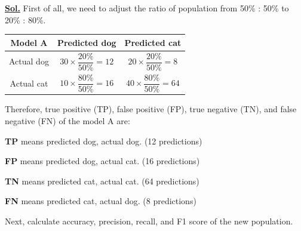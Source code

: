 \documentclass[12pt, a4paper]{article}
\newcommand{\sol}{\par\noindent\underline{\textbf{Sol.}} }
\begin{document}
\begin{enumerate}
            \sol First of all, we need to adjust the ratio of population from 50\% : 50\% to \\ 20\% : 80\%.

            \begin{table}[h]
                \centering
                \begin{tabular}{|c|c|c|}
                    \hline
                    Model A & Predicted dog & Predicted cat \\
                    \hline \hline
                    \rule{0pt}{4ex}
                    Actual dog & $30 \times \dfrac{20\%}{50\%} = 12$ & $20 \times \dfrac{20\%}{50\%} = 8$ \\[2ex]
                    \hline
                    \rule{0pt}{4ex}
                    Actual cat & $10 \times \dfrac{80\%}{50\%} = 16$ & $40 \times \dfrac{80\%}{50\%} = 64$ \\[2ex]
                    \hline \hline
                \end{tabular}
            \end{table}

            Therefore, true positive (TP), false positive (FP), true negative (TN), and false negative (FN) of the model A are:

            \textbf{TP} means predicted dog, actual dog. (12 predictions)

            \textbf{FP} means predicted dog, actual cat. (16 predictions)

            \textbf{TN} means predicted cat, actual cat. (64 predictions)

            \textbf{FN} means predicted cat, actual dog. (8 predictions)

            \vspace{1em}

            Next, calculate accuracy, precision, recall, and F1 score of the new population.

            \vspace{1em}


\end{enumerate}
\end{document}
